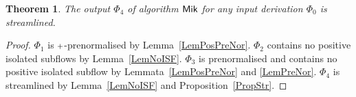 \documentclass[a4paper]{amsart}
\newif\iflmcs\lmcsfalse %
\newtheorem{thm}{Theorem}[section]
\theoremstyle{remark}
\theoremstyle{definition}
\begin{document}
\begin{thm}
The output $\Phi_4$ of algorithm $\mathsf{Mik}$ for any input derivation $\Phi_0$ is streamlined.
\end{thm}

\begin{proof}
$\Phi_1$ is $\ppl$-prenormalised by Lemma~\ref{LemPosPreNor}. $\Phi_2$ contains no positive isolated subflows by Lemma~\ref{LemNoISF}. $\Phi_3$ is prenormalised and contains no positive isolated subflow by Lemmata~\ref{LemPosPreNor} and \ref{LemPreNor}. $\Phi_4$ is streamlined by Lemma~\ref{LemNoISF} and Proposition~\ref{PropStr}.
\end{proof}



\iflmcs\else\let\oldurl\url\renewcommand{\url}[1]{\hfill\break\oldurl{#1}}\fi



\end{document}
